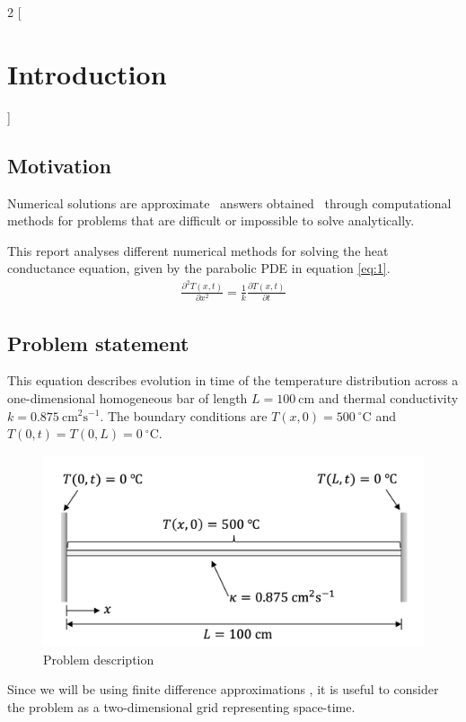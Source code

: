\documentclass[a4paper]{article} %
\begin{document}
\begin{multicols}{2}
[
\section{Introduction}
]
\subsection{Motivation}
Numerical solutions are approximate ~answers obtained~ through computational methods for problems that are difficult or impossible to solve analytically.
\par
This report analyses different numerical methods for solving the heat conductance equation, given by the parabolic PDE in equation \ref{eq:1}.
\begin{align} \label{eq:1}
\frac{\partial^2 T(x,t)}{\partial x^2} = \frac{1}{k}\frac{\partial T(x,t)}{\partial t}
\end{align}

\subsection{Problem statement}
This equation describes evolution in time of the temperature distribution across a one-dimensional homogeneous bar of length $L = 100\ \mathrm{ cm}$ and thermal conductivity $k = 0.875\ \mathrm{cm}^2\mathrm{s}^{-1}$. The boundary conditions are $T(x,0)=500\ ^\circ \mathrm{C}$ and $T(0,t) = T(0,L) = 0\ ^\circ \mathrm{C}$.

\begin{figure}[H]
    \centering
    \includegraphics[width=0.9\linewidth]{figs/layout.png}
    \caption{Problem description}
    \label{fig:layout}
\end{figure}

Since we will be using finite difference approximations , it is useful to consider the problem as a two-dimensional grid representing space-time.


\end{multicols}
\end{document}
